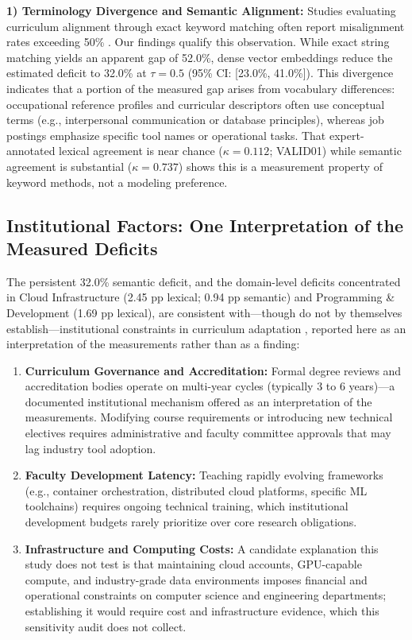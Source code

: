 \documentclass[journal]{IEEEtran}
\begin{document}
\textbf{1) Terminology Divergence and Semantic Alignment:} Studies evaluating curriculum alignment through exact keyword matching often report misalignment rates exceeding 50\% \cite{baral2026analyzing}. Our findings qualify this observation. While exact string matching yields an apparent gap of 52.0\%, dense vector embeddings reduce the estimated deficit to 32.0\% at $\tau = 0.5$ (95\% CI: [23.0\%, 41.0\%]). This divergence indicates that a portion of the measured gap arises from vocabulary differences: occupational reference profiles and curricular descriptors often use conceptual terms (e.g., interpersonal communication or database principles), whereas job postings emphasize specific tool names or operational tasks. That expert-annotated lexical agreement is near chance ($\kappa = 0.112$; VALID01) while semantic agreement is substantial ($\kappa = 0.737$) shows this is a measurement property of keyword methods, not a modeling preference.

\subsection{Institutional Factors: One Interpretation of the Measured Deficits}

The persistent 32.0\% semantic deficit, and the domain-level deficits concentrated in Cloud Infrastructure (2.45 pp lexical; 0.94 pp semantic) and Programming \& Development (1.69 pp lexical), are consistent with---though do not by themselves establish---institutional constraints in curriculum adaptation \cite{biggs1996enhancing}, reported here as an interpretation of the measurements rather than as a finding:
\begin{enumerate}
    \item \textbf{Curriculum Governance and Accreditation:} Formal degree reviews and accreditation bodies operate on multi-year cycles (typically 3 to 6 years)---a documented institutional mechanism offered as an interpretation of the measurements. Modifying course requirements or introducing new technical electives requires administrative and faculty committee approvals that may lag industry tool adoption.
    \item \textbf{Faculty Development Latency:} Teaching rapidly evolving frameworks (e.g., container orchestration, distributed cloud platforms, specific ML toolchains) requires ongoing technical training, which institutional development budgets rarely prioritize over core research obligations.
    \item \textbf{Infrastructure and Computing Costs:} A candidate explanation this study does not test is that maintaining cloud accounts, GPU-capable compute, and industry-grade data environments imposes financial and operational constraints on computer science and engineering departments; establishing it would require cost and infrastructure evidence, which this sensitivity audit does not collect.
\end{enumerate}
\end{document}
